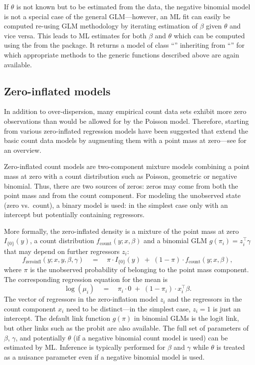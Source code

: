 \documentclass{Z}
\newcommand{\class}[1]{``\code{#1}''}
\newcommand{\fct}[1]{\code{#1()}}
\begin{document}
If $\theta$ is not known but to be estimated from the data,
the negative binomial model is not a special case of the general
GLM---however, an ML fit can easily be computed re-using GLM
methodology by iterating estimation of $\beta$ given $\theta$
and vice versa. This leads to ML estimates for both $\beta$
and $\theta$ which can be computed using the \fct{glm.nb}
from the  package. It returns a model of class \class{negbin}
inheriting from \class{glm} for which appropriate methods
to the generic functions described above are again available.


\subsection{Zero-inflated models}

In addition to over-dispersion, many empirical count data sets
exhibit more zero observations than would be allowed for
by the Poisson model. Therefore, starting from
\cite{countreg:Lambert:1992} various zero-inflated regression
models have been suggested that extend the basic count data models
by augmenting them with a point mass at zero---see
\cite{countreg:Cameron+Trivedi:1998,countreg:Cameron+Trivedi:2005}
for an overview.

Zero-inflated count models are two-component mixture models
combining a point mass at zero with a count distribution such as
Poisson, geometric or negative binomial. Thus, there are two
sources of zeros: zeros may come from both the point mass and
from the count component. For modeling the unobserved state
(zero vs.\ count), a binary model is used: in the simplest case
only with an intercept but potentially containing regressors.

More formally, the zero-inflated density is a mixture of the point mass
at zero $I_{\{0\}}(y)$, a count distribution $f_\mathrm{count}(y; x, \beta)$
and a binomial GLM $g(\pi_i) = z_i^\top \gamma$ that may depend on further
regressors $z_i$:
\begin{equation} \label{eq:zeroinfl}
f_\mathrm{zeroinfl}(y; x, y, \beta, \gamma) \quad = \quad
  \pi \cdot I_{\{0\}}(y) \; + \; (1 - \pi) \cdot f_\mathrm{count}(y; x, \beta),
\end{equation}
where $\pi$ is the unobserved probability of belonging to the point mass component.
The corresponding regression equation for the mean is
\begin{equation} \label{eq:zeroinfl-mean}
\log(\mu_i) \quad = \quad \pi_i \cdot 0 \; + \; (1 - \pi_i) \cdot x_i^\top \beta.
\end{equation}
The vector of regressors in the zero-inflation model $z_i$
and the regressors in the count component $x_i$ need to be distinct---in
the simplest case, $z_i = 1$ is just
an intercept. The default link function $g(\pi)$ in binomial GLMs is the
logit link, but other links such as the probit are also available. The full
set of parameters of $\beta$, $\gamma$, and potentially $\theta$ (if 
a negative binomial count model is used) can be estimated by ML. Inference
is typically performed for $\beta$ and $\gamma$ while $\theta$ is treated
as a nuisance parameter even if a negative binomial model is used.
\end{document}
